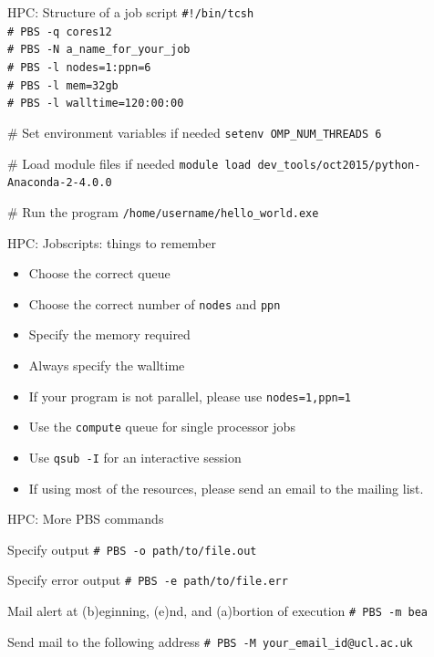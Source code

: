 \documentclass{beamer}
\begin{document}
\begin{frame}{HPC: Structure of a job script}
	\texttt{\#!/bin/tcsh \\
	\# PBS -q cores12 \\
	\# PBS -N a\_name\_for\_your\_job \\
	\# PBS -l nodes=1:ppn=6 \\
	\# PBS -l mem=32gb \\
	\# PBS -l walltime=120:00:00} \\
	
	\begin{block}{\# Set environment variables if needed}
	    \texttt{setenv OMP\_NUM\_THREADS 6}
        \end{block}
	\begin{block}{\# Load module files if needed}
	    \texttt{module load dev\_tools/oct2015/python-Anaconda-2-4.0.0}
        \end{block}
	\begin{block}{\# Run the program}
	    \texttt{/home/username/hello\_world.exe}
        \end{block}	
\end{frame}

\begin{frame}{HPC: Jobscripts: things to remember}
	\begin{itemize}
		\item Choose the correct queue
		\item Choose the correct number of \texttt{nodes} and \texttt{ppn}
		\item Specify the memory required
		\item Always specify the walltime
		\item If your program is not parallel, please use \texttt{nodes=1,ppn=1}
		\item Use the \texttt{compute} queue for single processor jobs
		\item Use \texttt{qsub -I} for an interactive session
		\item If using most of the resources, please send an email to the mailing list.
	\end{itemize}
\end{frame}

\begin{frame}{HPC: More PBS commands}
	\begin{block}{Specify output}
	    \texttt{\# PBS -o path/to/file.out}
        \end{block}
	\begin{block}{Specify error output}
	    \texttt{\# PBS -e path/to/file.err}
        \end{block}
	\begin{block}{Mail alert at (b)eginning, (e)nd, and (a)bortion of execution}
	    \texttt{\# PBS -m bea}
        \end{block}
	\begin{block}{Send mail to the following address}
	    \texttt{\# PBS -M your\_email\_id@ucl.ac.uk}
        \end{block}                        
\end{frame}
\end{document}
